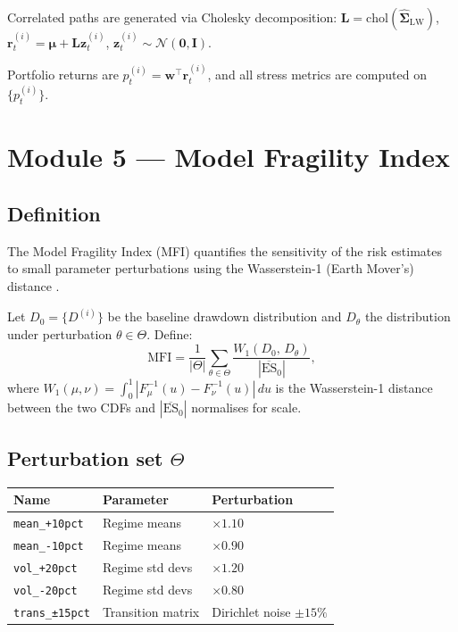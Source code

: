 \documentclass[12pt]{article}
\begin{document}
Correlated paths are generated via Cholesky decomposition:
$\mathbf{L} = \text{chol}(\hat{\boldsymbol\Sigma}_{\text{LW}})$,
$\mathbf{r}_t^{(i)} = \boldsymbol\mu + \mathbf{L}\mathbf{z}_t^{(i)}$,
$\mathbf{z}_t^{(i)} \sim \mathcal{N}(\mathbf{0},\mathbf{I})$.

Portfolio returns are $p_t^{(i)} = \mathbf{w}^\top \mathbf{r}_t^{(i)}$,
and all stress metrics are computed on $\{p_t^{(i)}\}$.

\section{Module 5 — Model Fragility Index}

\subsection{Definition}

The Model Fragility Index (MFI) quantifies the sensitivity of the
risk estimates to small parameter perturbations using the
Wasserstein-1 (Earth Mover's) distance \citep{Villani2008}.

Let $D_0 = \{D^{(i)}\}$ be the baseline drawdown distribution and
$D_\theta$ the distribution under perturbation $\theta \in \Theta$.
Define:
\begin{equation}
  \text{MFI} = \frac{1}{|\Theta|}\sum_{\theta\in\Theta}
    \frac{W_1(D_0,\, D_\theta)}{|\overline{\text{ES}}_0|},
\end{equation}
where
$W_1(\mu,\nu) = \int_0^1 |F_\mu^{-1}(u) - F_\nu^{-1}(u)|\,du$
is the Wasserstein-1 distance between the two CDFs and
$|\overline{\text{ES}}_0|$ normalises for scale.

\subsection{Perturbation set $\Theta$}

\begin{center}
\begin{tabular}{lll}
\toprule
Name & Parameter & Perturbation \\
\midrule
\texttt{mean\_+10pct}  & Regime means    & $\times 1.10$ \\
\texttt{mean\_-10pct}  & Regime means    & $\times 0.90$ \\
\texttt{vol\_+20pct}   & Regime std devs & $\times 1.20$ \\
\texttt{vol\_-20pct}   & Regime std devs & $\times 0.80$ \\
\texttt{trans\_±15pct} & Transition matrix & Dirichlet noise $\pm 15\%$ \\
\bottomrule
\end{tabular}
\end{center}
\end{document}
